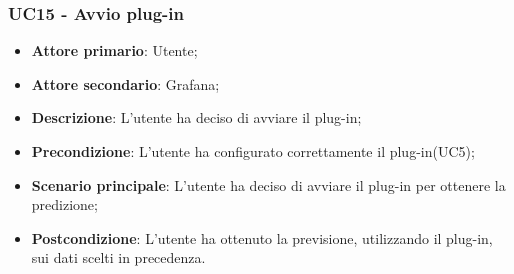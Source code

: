\subsubsection{UC15 - Avvio plug-in}
\label{sssec:uc15}
\begin{itemize}
  \item \textbf{Attore primario}: Utente;
  \item \textbf{Attore secondario}: Grafana;
  \item \textbf{Descrizione}: L'utente ha deciso di avviare il plug-in;
  \item \textbf{Precondizione}: L'utente ha configurato correttamente il plug-in(UC5);
  \item \textbf{Scenario principale}: L'utente ha deciso di avviare il plug-in per ottenere la predizione;
  \item \textbf{Postcondizione}: L'utente ha ottenuto la previsione, utilizzando il plug-in, sui dati scelti in precedenza.
\end{itemize}
